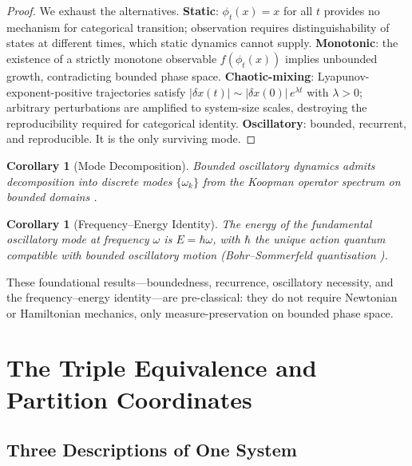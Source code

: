 \documentclass[twocolumn,10pt,a4paper]{article}
\newtheorem{corollary}[theorem]{Corollary}
\theoremstyle{definition}
\theoremstyle{remark}
\begin{document}
\begin{proof}
We exhaust the alternatives. \textbf{Static}: $\phi_t(x) = x$ for all $t$ provides no mechanism for categorical transition; observation requires distinguishability of states at different times, which static dynamics cannot supply. \textbf{Monotonic}: the existence of a strictly monotone observable $f(\phi_t(x))$ implies unbounded growth, contradicting bounded phase space. \textbf{Chaotic-mixing}: Lyapunov-exponent-positive trajectories satisfy $|\delta x(t)| \sim |\delta x(0)|\, e^{\lambda t}$ with $\lambda > 0$; arbitrary perturbations are amplified to system-size scales, destroying the reproducibility required for categorical identity. \textbf{Oscillatory}: bounded, recurrent, and reproducible. It is the only surviving mode.
\end{proof}

\begin{corollary}[Mode Decomposition]
\label{cor:modes}
Bounded oscillatory dynamics admits decomposition into discrete modes $\{\omega_k\}$ from the Koopman operator spectrum on bounded domains \citep{koopman1931}.
\end{corollary}

\begin{corollary}[Frequency--Energy Identity]
\label{cor:freq_energy}
The energy of the fundamental oscillatory mode at frequency $\omega$ is $E = \hbar\omega$, with $\hbar$ the unique action quantum compatible with bounded oscillatory motion (Bohr--Sommerfeld quantisation \citep{bohr1913,planck1901}).
\end{corollary}

These foundational results---boundedness, recurrence, oscillatory necessity, and the frequency--energy identity---are pre-classical: they do not require Newtonian or Hamiltonian mechanics, only measure-preservation on bounded phase space.

\section{The Triple Equivalence and Partition Coordinates}
\label{sec:triple}

\subsection{Three Descriptions of One System}
\end{document}
